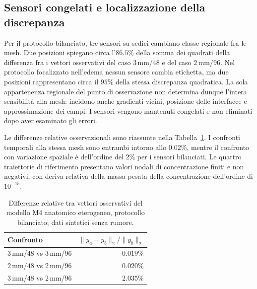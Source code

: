 \subsection*{Sensori congelati e localizzazione della discrepanza}
Per il protocollo bilanciato, tre sensori su sedici cambiano classe regionale fra le mesh. Due posizioni spiegano circa l'$86.5\%$ della somma dei quadrati della differenza fra i vettori osservativi del caso $3\,$mm/$48$ e del caso $2\,$mm/$96$. Nel protocollo focalizzato nell'edema nessun sensore cambia etichetta, ma due posizioni rappresentano circa il $95\%$ della stessa discrepanza quadratica. La sola appartenenza regionale del punto di osservazione non determina dunque l'intera sensibilit\`a alla mesh: incidono anche gradienti vicini, posizione delle interfacce e approssimazione dei campi. I sensori vengono mantenuti congelati e non eliminati dopo aver esaminato gli errori.

Le differenze relative osservazionali sono riassunte nella Tabella~\ref{tab:app-discrepancies}. I confronti temporali alla stessa mesh sono entrambi intorno allo $0.02\%$, mentre il confronto con variazione spaziale \`e dell'ordine del $2\%$ per i sensori bilanciati. Le quattro traiettorie di riferimento presentano valori nodali di concentrazione finiti e non negativi, con deriva relativa della massa pesata della concentrazione dell'ordine di $10^{-15}$.
\begin{table}[H]
\centering\caption{Differenze relative tra vettori osservativi del modello M4 anatomico eterogeneo, protocollo bilanciato; dati sintetici senza rumore.}\label{tab:app-discrepancies}
\small\setlength{\tabcolsep}{4pt}
\begin{tabular}{@{}lr@{}}\toprule
Confronto&$\|y_a-y_b\|_2/\|y_b\|_2$\\\midrule
$3\,$mm/$48$ vs $3\,$mm/$96$&$0.019\%$\\
$2\,$mm/$48$ vs $2\,$mm/$96$&$0.020\%$\\
$3\,$mm/$48$ vs $2\,$mm/$96$&$2.035\%$\\\bottomrule
\end{tabular}
\end{table}

